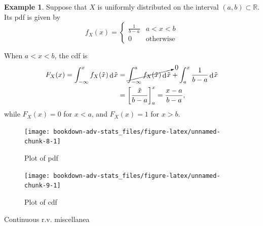 \documentclass[
]{book}
\newcommand{\bbR}{\mathbb{R}}
\DeclareMathOperator{\dd}{d}
\newcommand{\dint}{\dd\hspace{0.5pt}\!}
\theoremstyle{definition}
\theoremstyle{definition}
\newtheorem{example}{Example}[chapter]
\theoremstyle{definition}
\theoremstyle{definition}
\theoremstyle{remark}
\begin{document}
\begin{example}

Suppose that \(X\) is uniformly distributed on the interval \((a,b) \subset \bbR\).
Its pdf is given by
\[
f_X(x) = \begin{cases}
\frac{1}{b-a} & a < x < b \\
0 & \text{otherwise}
\end{cases}
\]

When \(a < x < b\), the cdf is
\begin{align*}
F_X(x) 
= \int_{-\infty}^x f_X(\tilde x) \dint \tilde x 
&=\cancelto{0}{\int_{-\infty}^a f_X(\tilde x) \dint \tilde x}  + \int_{a}^x \frac{1}{b-a} \dint \tilde x \\
&= \left[ \frac{\tilde x}{b-a} \right]_a^x = \frac{x-a}{b-a},
\end{align*}
while \(F_X(x) = 0\) for \(x<a\), and \(F_X(x)=1\) for \(x>b\).

\begin{figure}

{\centering \texttt{[image: bookdown-adv-stats\_files/figure-latex/unnamed-chunk-8-1]} 

}

\caption{Plot of pdf}\label{fig:unnamed-chunk-8}
\end{figure}

\begin{figure}

{\centering \texttt{[image: bookdown-adv-stats\_files/figure-latex/unnamed-chunk-9-1]} 

}

\caption{Plot of cdf}\label{fig:unnamed-chunk-9}
\end{figure}

\end{example}

Continuous r.v. miscellanea
\end{document}
